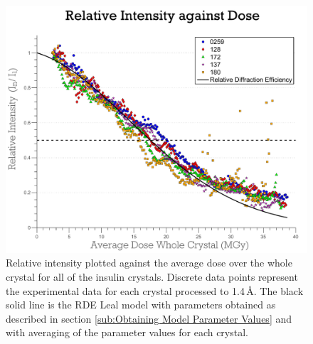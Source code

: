 \begin{figure}
    \centering
    \includegraphics[width=1\textwidth]{figures/dwd/relintall_14A.pdf}
    \caption[Leal \textit{et al.} RDE model fitted to all insulin relative intensity data.]{Relative intensity plotted against the average dose over the whole crystal for all of the insulin crystals. Discrete data points represent the experimental data for each crystal processed to 1.4\,\AA. The black solid line is the RDE Leal model with parameters obtained as described in section \ref{sub:Obtaining Model Parameter Values} and with averaging of the parameter values for each crystal.}
    \label{fig:Relative Intensity - All crystals 1.4 Angstroms}
\end{figure}
